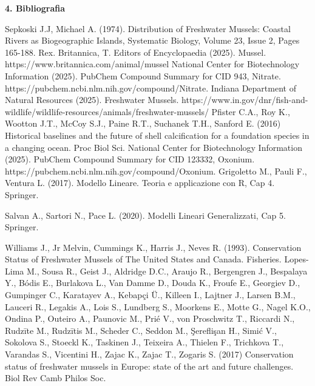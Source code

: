 \documentclass{article} %
\begin{document}
\newpage
\begin{flushleft}
    \vskip 70pt
    \textbf{\Huge 4. \: Bibliografia}
\end{flushleft}
\renewcommand{\refname}{}
\begin{thebibliography}{9}

Sepkoski J.J, Michael A. (1974). Distribution of Freshwater Mussels: Coastal Rivers as Biogeographic Islands, Systematic Biology, Volume 23, Issue 2, Pages 165-188. Rex.
Britannica, T. Editors of Encyclopaedia (2025). Mussel. https://www.britannica.com/animal/mussel
National Center for Biotechnology Information (2025). PubChem Compound Summary for CID 943, Nitrate. https://pubchem.ncbi.nlm.nih.gov/compound/Nitrate.
Indiana Department of Natural Resources (2025). Freshwater Mussels. https://www.in.gov/dnr/fish-and-wildlife/wildlife-resources/animals/freshwater-mussels/
Pfister C.A., Roy K., Wootton J.T., McCoy S.J., Paine R.T., Suchanek T.H., Sanford E. (2016) Historical baselines and the future of shell calcification for a foundation species in a changing ocean. Proc Biol Sci.
National Center for Biotechnology Information (2025). PubChem Compound Summary for CID 123332, Oxonium. https://pubchem.ncbi.nlm.nih.gov/compound/Oxonium.
Grigoletto M., Pauli F., Ventura L. (2017). Modello Lineare. Teoria e applicazione con R, Cap 4. Springer.

Salvan A., Sartori N., Pace L. (2020). Modelli Lineari Generalizzati, Cap 5. Springer.

Williams J., Jr Melvin, Cummings K., Harris J., Neves R. (1993). Conservation Status of Freshwater Mussels of The United States and Canada. Fisheries. 
Lopes-Lima M., Sousa R., Geist J., Aldridge D.C., Araujo R., Bergengren J., Bespalaya Y., Bódis E., Burlakova L., Van Damme D., Douda K., Froufe E., Georgiev D., Gumpinger C., Karatayev A., Kebapçi Ü., Killeen I., Lajtner J., Larsen B.M., Lauceri R., Legakis A., Lois S., Lundberg S., Moorkens E., Motte G., Nagel K.O., Ondina P., Outeiro A., Paunovic M., Prié V., von Proschwitz T., Riccardi N., Rudzīte M., Rudzītis M., Scheder C., Seddon M., Şereflişan H., Simić V., Sokolova S., Stoeckl K., Taskinen J., Teixeira A., Thielen F., Trichkova T., Varandas S., Vicentini H., Zajac K., Zajac T., Zogaris S. (2017) Conservation status of freshwater mussels in Europe: state of the art and future challenges. Biol Rev Camb Philos Soc.



\end{thebibliography}
\end{document}
